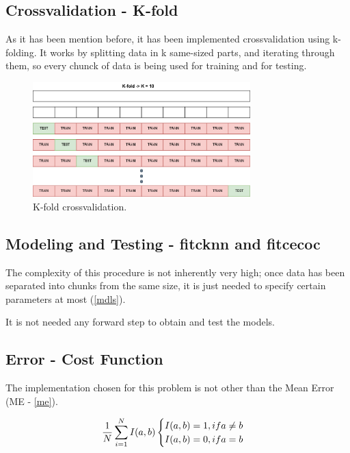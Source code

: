 \documentclass[11pt]{article}
\begin{document}
\subsection{Crossvalidation - K-fold}

As it has been mention before, it has been implemented crossvalidation using
k-folding. It works by splitting data in k same-sized parts, and iterating
through them, so every chunck of data is being used for training and for
testing.

\begin{figure}[h]
 \centering
 \includegraphics[width=0.75\textwidth]{../diagrams/kfold.png}
 \caption{K-fold crossvalidation.}
\end{figure}

\subsection{Modeling and Testing - fitcknn and fitcecoc}

The complexity of this procedure is not inherently very high; once data has been
separated into chunks from the same size, it is just needed to specify certain
parameters at most (\hyperref[mdls]{\ref{mdls}}).

It is not needed any forward step to obtain and test the models.

\subsection{Error - Cost Function}

The implementation chosen for this problem is not other than the Mean Error
(ME - \hyperref[me]{\ref{me}}).

\begin{equation}
 \centering
 \frac{1}{N} \sum_{i=1}^{N} {I(a, b)} \label{me}

 \begin{cases}
  I(a, b) = 1, if a \neq b\\
  I(a, b) = 0, if a = b
 \end{cases}
\end{equation}
\end{document}
